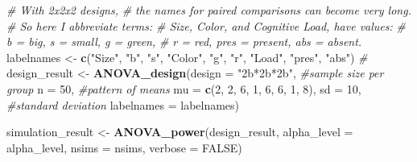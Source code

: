 \documentclass[]{book}
\newenvironment{Shaded}{\begin{snugshade}}{\end{snugshade}}
\newcommand{\CommentTok}[1]{\textcolor[rgb]{0.56,0.35,0.01}{\textit{#1}}}
\newcommand{\DataTypeTok}[1]{\textcolor[rgb]{0.13,0.29,0.53}{#1}}
\newcommand{\DecValTok}[1]{\textcolor[rgb]{0.00,0.00,0.81}{#1}}
\newcommand{\KeywordTok}[1]{\textcolor[rgb]{0.13,0.29,0.53}{\textbf{#1}}}
\newcommand{\NormalTok}[1]{#1}
\newcommand{\OtherTok}[1]{\textcolor[rgb]{0.56,0.35,0.01}{#1}}
\newcommand{\StringTok}[1]{\textcolor[rgb]{0.31,0.60,0.02}{#1}}
\begin{document}
\begin{Shaded}
\begin{Highlighting}[]
\CommentTok{# With 2x2x2 designs, }
\CommentTok{# the names for paired comparisons can become very long. }
\CommentTok{# So here I abbreviate terms: }
\CommentTok{#   Size, Color, and Cognitive Load, have values:}
\CommentTok{# b = big, s = small, g = green, }
\CommentTok{# r = red, pres = present, abs = absent.  }
\NormalTok{labelnames <-}\StringTok{ }\KeywordTok{c}\NormalTok{(}\StringTok{"Size"}\NormalTok{, }\StringTok{"b"}\NormalTok{, }\StringTok{"s"}\NormalTok{, }\StringTok{"Color"}\NormalTok{, }\StringTok{"g"}\NormalTok{, }\StringTok{"r"}\NormalTok{, }
                \StringTok{"Load"}\NormalTok{, }\StringTok{"pres"}\NormalTok{, }\StringTok{"abs"}\NormalTok{) }\CommentTok{#}
\NormalTok{design_result <-}\StringTok{ }\KeywordTok{ANOVA_design}\NormalTok{(}\DataTypeTok{design =} \StringTok{"2b*2b*2b"}\NormalTok{, }
                              \CommentTok{#sample size per group }
                              \DataTypeTok{n =} \DecValTok{50}\NormalTok{, }
                              \CommentTok{#pattern of means}
                              \DataTypeTok{mu =} \KeywordTok{c}\NormalTok{(}\DecValTok{2}\NormalTok{, }\DecValTok{2}\NormalTok{, }\DecValTok{6}\NormalTok{, }\DecValTok{1}\NormalTok{, }\DecValTok{6}\NormalTok{, }\DecValTok{6}\NormalTok{, }\DecValTok{1}\NormalTok{, }\DecValTok{8}\NormalTok{), }
                              \DataTypeTok{sd =} \DecValTok{10}\NormalTok{, }\CommentTok{#standard deviation}
                              \DataTypeTok{labelnames =}\NormalTok{ labelnames) }
\end{Highlighting}
\end{Shaded}

\begin{Shaded}
\begin{Highlighting}[]
\NormalTok{simulation_result <-}\StringTok{ }\KeywordTok{ANOVA_power}\NormalTok{(design_result, }
                                 \DataTypeTok{alpha_level =}\NormalTok{ alpha_level, }
                                 \DataTypeTok{nsims =}\NormalTok{ nsims,}
                                 \DataTypeTok{verbose =} \OtherTok{FALSE}\NormalTok{)}
\end{Highlighting}
\end{Shaded}
\end{document}
